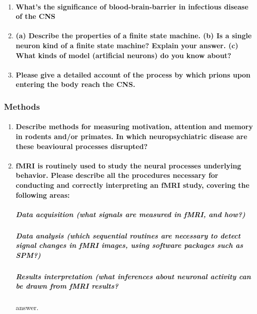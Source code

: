 \documentclass[12pt,article,oneside,a4paper]{memoir}
\begin{document}
\begin{enumerate}
\item \paragraph{What's the significance of blood-brain-barrier in infectious disease of the CNS}

\item \paragraph{ (a) Describe the properties of a finite state machine. (b) Is a single neuron kind of  a finite state machine? Explain your answer. (c) What kinds of model (artificial neurons) do you know about?}

\item \paragraph{Please give a detailed account of the process by which prions upon entering the body reach the CNS.}

\end{enumerate}

\subsubsection{Methods}
\begin{enumerate}
\item \paragraph{Describe methods for measuring motivation, attention and memory in rodents and/or primates. In which neuropsychiatric disease are these beavioural processes disrupted?}

\item \paragraph{ fMRI is routinely used to study the neural processes underlying behavior. Please describe all the procedures necessary for conducting and correctly interpreting an fMRI study, covering the following areas:}
\subparagraph{Data acquisition (what signals are measured in fMRI, and how?)}
\subparagraph{Data analysis (which sequential routines are necessary to detect signal changes in fMRI images, using software packages such as SPM?)}
\subparagraph{Results interpretation (what inferences about neuronal activity can be drawn from fMRI results?} answer.

\end{enumerate}
\end{document}
